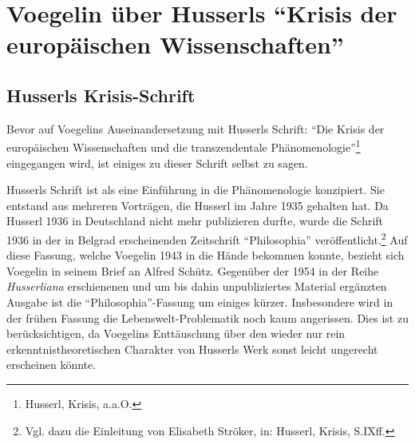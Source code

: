 \section{Voegelin über Husserls "`Krisis der europäischen
  Wissenschaften"'}

\subsection{Husserls Krisis-Schrift}

Bevor auf Voegelins Auseinandersetzung mit Husserls Schrift: "`Die Krisis der
europäischen Wissenschaften und die transzendentale
Phänomenologie"'\footnote{Husserl, Krisis, a.a.O.} eingegangen wird, ist
einiges zu dieser Schrift selbst zu sagen.

Husserls Schrift ist als eine Einführung in die Phänomenologie konzipiert. Sie
entstand aus mehreren Vorträgen, die Husserl im Jahre 1935 gehalten hat. Da
Husserl 1936 in Deutschland nicht mehr publizieren durfte, wurde die Schrift
1936 in der in Belgrad erscheinenden Zeitschrift "`Philosophia"'
veröffentlicht.\footnote{Vgl. dazu die Einleitung von Elisabeth Ströker, in:
  Husserl, Krisis, S.IXff.} Auf diese Fassung, welche Voegelin 1943 in die
Hände bekommen konnte, bezieht sich Voegelin in seinem Brief an Alfred Schütz.
Gegenüber der 1954 in der Reihe {\it Husserliana} erschienenen und um bis
dahin unpubliziertes Material ergänzten Ausgabe ist die
"`Philosophia"'-Fassung um einiges kürzer. Insbesondere wird in der frühen
Fassung die Lebenswelt-Problematik noch kaum angerissen. Dies ist zu
berücksichtigen, da Voegelins Enttäuschung über den wieder nur rein
erkenntnistheoretischen Charakter von Husserls Werk sonst leicht ungerecht
erscheinen könnte.

